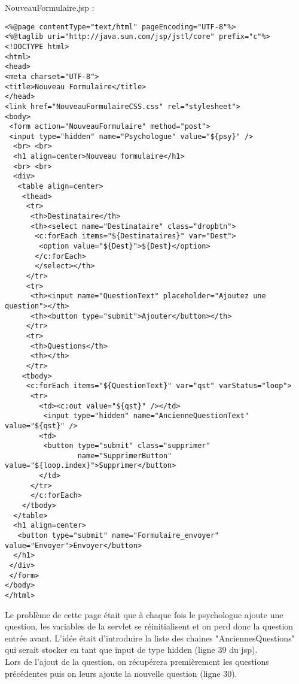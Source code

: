 \documentclass[12]{article}
\begin{document}
NouveauFormulaire.jsp :

\begin{scriptsize}

\lstset{language=XML}
\begin{lstlisting}
<%@page contentType="text/html" pageEncoding="UTF-8"%>
<%@taglib uri="http://java.sun.com/jsp/jstl/core" prefix="c"%>
<!DOCTYPE html>
<html>
<head>
<meta charset="UTF-8">
<title>Nouveau Formulaire</title>
</head>
<link href="NouveauFormulaireCSS.css" rel="stylesheet">
<body>
 <form action="NouveauFormulaire" method="post">
 <input type="hidden" name="Psychologue" value="${psy}" />
  <br> <br>
  <h1 align=center>Nouveau formulaire</h1>
  <br> <br>
  <div>
   <table align=center>
    <thead>
     <tr>
	  <th>Destinataire</th>
	  <th><select name="Destinataire" class="dropbtn">
	   <c:forEach items="${Destinataires}" var="Dest">
		<option value="${Dest}">${Dest}</option>
	   </c:forEach>
	   </select></th>
	 </tr>
     <tr>
	  <th><input name="QuestionText" placeholder="Ajoutez une question"></th>
	  <th><button type="submit">Ajouter</button></th>
	 </tr>
	 <tr>
	  <th>Questions</th>
	  <th></th>
	 </tr>
	<tbody>
     <c:forEach items="${QuestionText}" var="qst" varStatus="loop">
	  <tr>
	    <td><c:out value="${qst}" /></td>
		 <input type="hidden" name="AncienneQuestionText" value="${qst}" />
		<td>
 		 <button type="submit" class="supprimer" 
 		         name="SupprimerButton" value="${loop.index}">Supprimer</button>
		</td>
	  </tr>
	  </c:forEach>
	</tbody>
  </table>
  <h1 align=center>
   <button type="submit" name="Formulaire_envoyer" value="Envoyer">Envoyer</button>
  </h1>
 </div>
 </form>
</body>
</html>

\end{lstlisting}

\end{scriptsize}





Le problème de cette page était que à chaque fois le psychologue ajoute une question, les variables de la servlet se réinitialisent et on perd donc la question entrée avant. L'idée était d'introduire la liste des chaines "AnciennesQuestions" qui serait stocker en tant que input de type hidden (ligne 39 du jsp).\\

Lors de l'ajout de la question, on récupérera premièrement les questions précédentes puis on leurs ajoute la nouvelle question (ligne 30).\\
\end{document}
